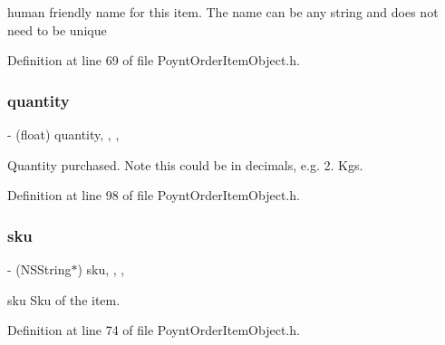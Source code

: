 human friendly name for this item.  The name can be any string and does not need to be unique 



Definition at line 69 of file Poynt\+Order\+Item\+Object.\+h.

\hypertarget{interface_poynt_order_item_object_ab39715c10682638e342e25893caa7372}{}\label{interface_poynt_order_item_object_ab39715c10682638e342e25893caa7372} 
\subsubsection{\texorpdfstring{quantity}{quantity}}
{\footnotesize\ttfamily -\/ (float) quantity\hspace{0.3cm}{\ttfamily [read]}, {\ttfamily [write]}, {\ttfamily [nonatomic]}, {\ttfamily [assign]}}



Quantity purchased.  Note this could be in decimals, e.\+g. 2. Kgs. 



Definition at line 98 of file Poynt\+Order\+Item\+Object.\+h.

\hypertarget{interface_poynt_order_item_object_a40fae7616715aeb5f241af769a5f55b4}{}\label{interface_poynt_order_item_object_a40fae7616715aeb5f241af769a5f55b4} 
\subsubsection{\texorpdfstring{sku}{sku}}
{\footnotesize\ttfamily -\/ (N\+S\+String$\ast$) sku\hspace{0.3cm}{\ttfamily [read]}, {\ttfamily [write]}, {\ttfamily [nonatomic]}, {\ttfamily [copy]}}



sku  Sku of the item. 



Definition at line 74 of file Poynt\+Order\+Item\+Object.\+h.

\hypertarget{interface_poynt_order_item_object_ac2acf327011ce6ed9e26a41ceddaee31}{}\label{interface_poynt_order_item_object_ac2acf327011ce6ed9e26a41ceddaee31} 

